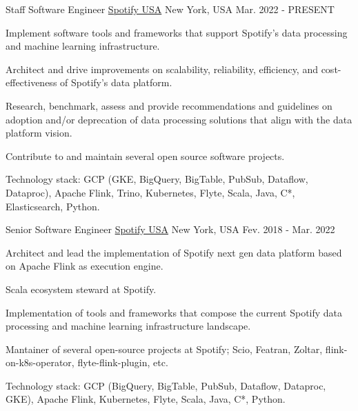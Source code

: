 

\begin{cventries}

	\cventry
	{Staff Software Engineer} %
	{\href{https://spotify.com}{ Spotify USA}} %
	{New York, USA} %
	{Mar. 2022 - PRESENT} %
	{
		\begin{cvitems} %
			\item {Implement software tools and frameworks that support Spotify’s data processing and machine learning infrastructure.}
			\item {Architect and drive improvements on scalability, reliability, efficiency, and cost-effectiveness of Spotify’s data platform.}
			\item {Research, benchmark, assess and provide recommendations and guidelines on adoption and/or deprecation of data processing solutions that align with the data platform vision.}
			\item {Contribute to and maintain several open source software projects.}
			\item {Technology stack: GCP (GKE, BigQuery, BigTable, PubSub, Dataflow, Dataproc), Apache Flink, Trino, Kubernetes, Flyte, Scala, Java, C*, Elasticsearch, Python.}
		\end{cvitems}
	}

	\cventry
	{Senior Software Engineer} %
	{\href{https://spotify.com}{ Spotify USA}} %
	{New York, USA} %
	{Fev. 2018 - Mar. 2022} %
	{
		\begin{cvitems} %
			\item {Architect and lead the implementation of Spotify next gen data platform based on Apache Flink as execution engine.}
			\item {Scala ecosystem steward at Spotify.}
			\item {Implementation of tools and frameworks that compose the current Spotify data processing and machine learning infrastructure landscape.}
			\item {Mantainer of several open-source projects at Spotify; Scio, Featran, Zoltar, flink-on-k8s-operator, flyte-flink-plugin, etc.}
			\item {Technology stack: GCP (BigQuery, BigTable, PubSub, Dataflow, Dataproc, GKE), Apache Flink, Kubernetes, Flyte, Scala, Java, C*, Python.}
		\end{cvitems}
	}


\end{cventries}
